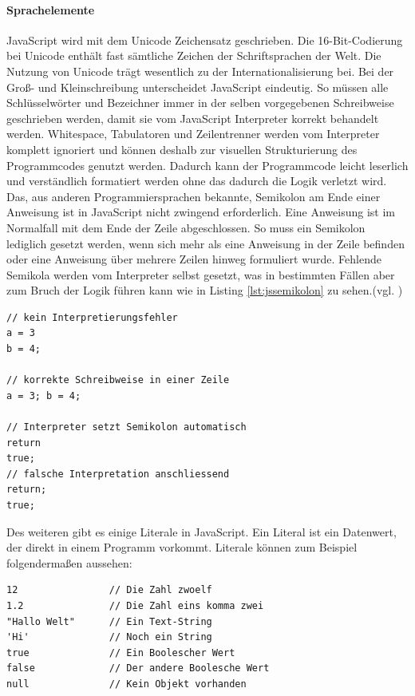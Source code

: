 \documentclass[12pt,a4paper,bibliography=totocnumbered,listof=totocnumbered]{scrartcl}
\begin{document}
\paragraph{Sprachelemente} JavaScript wird mit dem Unicode Zeichensatz geschrieben. Die 16-Bit-Codierung bei Unicode enthält fast sämtliche Zeichen der Schriftsprachen der Welt. Die Nutzung von Unicode trägt wesentlich zu der Internationalisierung bei. Bei der Groß- und Kleinschreibung unterscheidet JavaScript eindeutig. So müssen alle Schlüsselwörter und Bezeichner immer in der selben vorgegebenen Schreibweise geschrieben werden, damit sie vom JavaScript Interpreter korrekt behandelt werden. Whitespace, Tabulatoren und Zeilentrenner werden vom Interpreter komplett ignoriert und können deshalb zur visuellen Strukturierung des Programmcodes genutzt werden. Dadurch kann der Programmcode leicht leserlich und verständlich formatiert werden ohne das dadurch die Logik verletzt wird. Das, aus anderen Programmiersprachen bekannte, Semikolon am Ende einer Anweisung ist in JavaScript nicht zwingend erforderlich. Eine Anweisung ist im Normalfall mit dem Ende der Zeile abgeschlossen. So muss ein Semikolon lediglich gesetzt werden, wenn sich mehr als eine Anweisung in der Zeile befinden oder eine Anweisung über mehrere Zeilen hinweg formuliert wurde. Fehlende Semikola werden vom Interpreter selbst gesetzt, was in bestimmten Fällen aber zum Bruch der Logik führen kann wie in Listing \ref{lst:jssemikolon} zu sehen.(vgl. \cite[S.15ff]{FlanJava2007})

	\vspace{1em}
	\begin{lstlisting}[caption=JavaScript Logikbruch Semikolon, label=lst:jssemikolon]
// kein Interpretierungsfehler
a = 3
b = 4;

// korrekte Schreibweise in einer Zeile
a = 3; b = 4;

// Interpreter setzt Semikolon automatisch
return
true;
// falsche Interpretation anschliessend
return;
true;
	\end{lstlisting}

Des weiteren gibt es einige Literale in JavaScript. \glqq Ein Literal ist ein Datenwert, der direkt in einem Programm vorkommt. Literale können zum Beispiel folgendermaßen aussehen:\grqq{}\cite[S.18]{FlanJava2007}

	\vspace{1em}
	\begin{lstlisting}[caption=JavaScript Literale, label=lst:jsliterale]
12                // Die Zahl zwoelf
1.2               // Die Zahl eins komma zwei
"Hallo Welt"      // Ein Text-String
'Hi'              // Noch ein String
true              // Ein Boolescher Wert
false             // Der andere Boolesche Wert
null              // Kein Objekt vorhanden
	\end{lstlisting}
	
\end{document}
